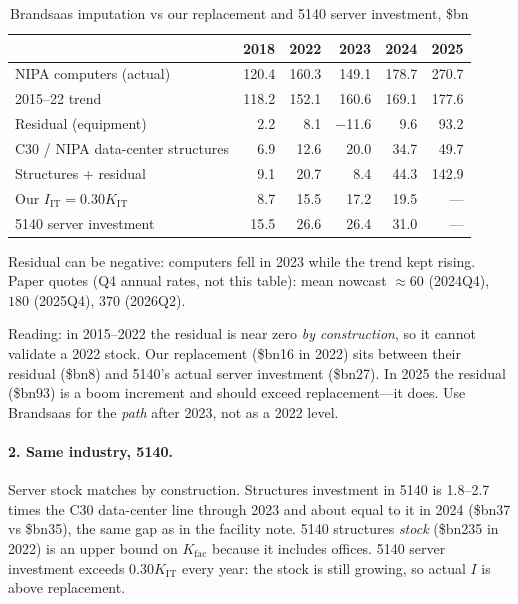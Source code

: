 \documentclass[11pt]{article}
\newcommand{\bn}{\$bn}
\begin{document}
\begin{table}[ht]
\centering
\begin{threeparttable}
\caption{Brandsaas imputation vs our replacement and 5140 server investment, \bn}
\label{tab:brandsaas}
\small
\begin{tabular}{lrrrrr}
\toprule
 & 2018 & 2022 & 2023 & 2024 & 2025 \\
\midrule
NIPA computers (actual) & 120.4 & 160.3 & 149.1 & 178.7 & 270.7 \\
2015--22 trend & 118.2 & 152.1 & 160.6 & 169.1 & 177.6 \\
Residual (equipment) & 2.2 & 8.1 & $-$11.6 & 9.6 & 93.2 \\
C30 / NIPA data-center structures & 6.9 & 12.6 & 20.0 & 34.7 & 49.7 \\
Structures + residual & 9.1 & 20.7 & 8.4 & 44.3 & 142.9 \\
Our $I_{\mathrm{IT}}=0.30K_{\mathrm{IT}}$ & 8.7 & 15.5 & 17.2 & 19.5 & --- \\
5140 server investment & 15.5 & 26.6 & 26.4 & 31.0 & --- \\
\bottomrule
\end{tabular}
\begin{tablenotes}\footnotesize
\item Residual can be negative: computers fell in 2023 while the trend kept rising. Paper quotes (Q4 annual rates, not this table): mean nowcast $\approx 60$ (2024Q4), $180$ (2025Q4), $370$ (2026Q2).
\end{tablenotes}
\end{threeparttable}
\end{table}

Reading: in 2015--2022 the residual is near zero \emph{by construction}, so it cannot validate a 2022 stock. Our replacement (\bn16 in 2022) sits between their residual (\bn8) and 5140's actual server investment (\bn27). In 2025 the residual (\bn93) is a boom increment and should exceed replacement---it does. Use Brandsaas for the \emph{path} after 2023, not as a 2022 level.

\paragraph{2. Same industry, 5140.}
Server stock matches by construction. Structures investment in 5140 is 1.8--2.7 times the C30 data-center line through 2023 and about equal to it in 2024 (\bn37 vs \bn35), the same gap as in the facility note. 5140 structures \emph{stock} (\bn235 in 2022) is an upper bound on $K_{\mathrm{fac}}$ because it includes offices. 5140 server investment exceeds $0.30K_{\mathrm{IT}}$ every year: the stock is still growing, so actual $I$ is above replacement.
\end{document}
